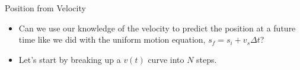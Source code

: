 \documentclass{beamer}
\begin{document}
\begin{frame}{Position from Velocity}
\begin{itemize}
   \item Can we use our knowledge of the velocity to predict the position at a future time like we did with the uniform motion equation, $s_f = s_i+v_s\Delta t$?
   \item<2-> Let's start by breaking up a $v(t)$ curve into $N$ steps.
\end{itemize}
\end{frame}
\end{document}
